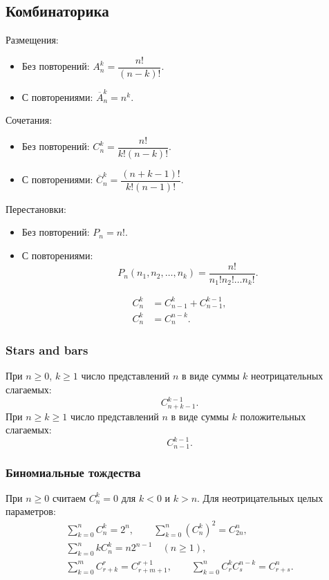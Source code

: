 \subsection{Комбинаторика}
Размещения:
\begin{itemize}
  \item Без повторений: $A_n^k = \dfrac{n!}{(n - k)!}$.
  \item С повторениями: $\overline{A}_n^k = n^k$.
\end{itemize}
Сочетания:
\begin{itemize}
  \item Без повторений: $C_n^k = \dfrac{n!}{k!(n - k)!}$.
  \item С повторениями: $\overline{C}_n^k = \dfrac{(n + k - 1)!}{k!(n - 1)!}$.
\end{itemize}
Перестановки:
\begin{itemize}
  \item Без повторений: $P_n = n!$.
  \item С повторениями:
    \[
      P_n(n_1, n_2, \dots, n_k) = \frac{n!}{n_1!n_2!\dots n_k!}.
    \]
\end{itemize}
\[
  \begin{aligned}
    C_n^k &= C_{n - 1}^k + C_{n - 1}^{k - 1}, \\
    C_n^k &= C_n^{n - k}.
  \end{aligned}
\]

\subsubsection*{Stars and bars}
При $n \ge 0$, $k \ge 1$ число представлений $n$ в виде суммы $k$ неотрицательных слагаемых:
\[
  C_{n + k - 1}^{k - 1}.
\]
При $n \ge k \ge 1$ число представлений $n$ в виде суммы $k$ положительных слагаемых:
\[
  C_{n - 1}^{k - 1}.
\]

\subsubsection*{Биномиальные тождества}
При $n \ge 0$ считаем $C_n^k=0$ для $k<0$ и $k>n$.
Для неотрицательных целых параметров:
\[
  \begin{gathered}
    \sum_{k=0}^{n} C_n^k=2^n, \qquad
    \sum_{k=0}^{n}(C_n^k)^2=C_{2n}^n, \\
    \sum_{k=0}^{n} kC_n^k=n2^{n-1}\quad(n\ge1), \\
    \sum_{k=0}^{m} C_{r+k}^{r}=C_{r+m+1}^{r+1}, \qquad
    \sum_{k=0}^{n} C_r^k C_s^{n-k}=C_{r+s}^{n}.
  \end{gathered}
\]

